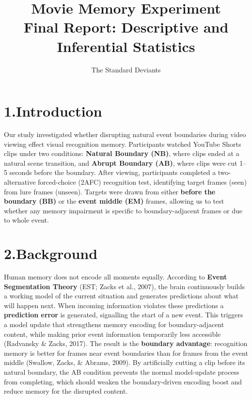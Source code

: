 \documentclass[11pt]{article}
\title{\vspace{-2em}\textbf{Movie Memory Experiment}\\[0.4em]
{\large Final Report: Descriptive and Inferential Statistics}}
\author{The Standard Deviants}
\date{}
\begin{document}
\maketitle
\vspace{-1em}

\section*{1.\quad Introduction}

Our study investigated whether disrupting natural event boundaries during video viewing effect visual recognition memory. Participants watched YouTube Shorts clips under two conditions: \textbf{Natural Boundary (NB)}, where clips ended at a natural scene transition, and \textbf{Abrupt Boundary (AB)}, where clips were cut 1--5 seconds before the boundary. After viewing, participants completed a two-alternative forced-choice (2AFC) recognition test, identifying target frames (seen) from lure frames (unseen). Targets were drawn from either \textbf{before the boundary (BB)} or the \textbf{event middle (EM)} frames, allowing us to test whether any memory impairment is specific to boundary-adjacent frames or due to whole event.

\section*{2.\quad Background}

Human memory does not encode all moments equally. According to \textbf{Event Segmentation Theory} (EST; Zacks et al., 2007), the brain continuously builds a working model of the current situation and generates predictions about what will happen next. When incoming information violates these predictions a \textbf{prediction error} is generated, signalling the start of a new event. This triggers a model update that strengthens memory encoding for boundary-adjacent content, while making prior event information temporarily less accessible (Radvansky \& Zacks, 2017). The result is the \textbf{boundary advantage}: recognition memory is better for frames near event boundaries than for frames from the event middle (Swallow, Zacks, \& Abrams, 2009). By artificially cutting a clip before its natural boundary, the AB condition prevents the normal model-update process from completing, which should weaken the boundary-driven encoding boost and reduce memory for the disrupted content.
\end{document}
